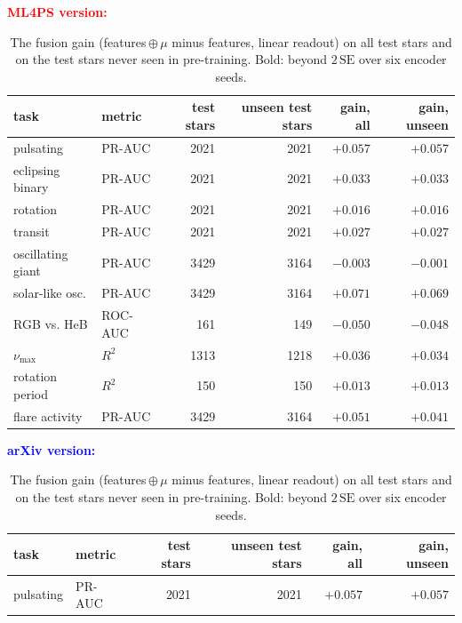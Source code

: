 \documentclass{article}
\providecommand{\DIFaddbeginFL}{} %
\providecommand{\DIFdelbeginFL}{} %
\providecommand{\DIFdelendFL}{} %
\providecommand{\DIFscaledelfig}{0.5}
\newlength{\DIFdelgraphicswidth} %
\newlength{\DIFdelgraphicsheight} %
\providecommand{\DIFaddincludegraphics}[2][]{{\color{blue}\fbox{\DIFOincludegraphics[#1]{#2}}}} %
\providecommand{\DIFdelincludegraphics}[2][]{%
\sbox{\DIFdelgraphicsbox}{\DIFOincludegraphics[#1]{#2}}%
\settoboxwidth{\DIFdelgraphicswidth}{\DIFdelgraphicsbox} %
\settoboxtotalheight{\DIFdelgraphicsheight}{\DIFdelgraphicsbox} %
\scalebox{\DIFscaledelfig}{%
\parbox[b]{\DIFdelgraphicswidth}{\usebox{\DIFdelgraphicsbox}\\[-\baselineskip] \rule{\DIFdelgraphicswidth}{0em}}\llap{\resizebox{\DIFdelgraphicswidth}{\DIFdelgraphicsheight}{%
\setlength{\unitlength}{\DIFdelgraphicswidth}%
\begin{picture}(1,1)%
\thicklines\linethickness{2pt} %
{\color[rgb]{1,0,0}\put(0,0){\framebox(1,1){}}}%
{\color[rgb]{1,0,0}\put(0,0){\line( 1,1){1}}}%
{\color[rgb]{1,0,0}\put(0,1){\line(1,-1){1}}}%
\end{picture}%
}\hspace*{3pt}}} %
} %
\DeclareRobustCommand{\DIFaddbeginFL}{\DIFOaddbeginFL \let\includegraphics\DIFaddincludegraphics} %
\DeclareRobustCommand{\DIFdelbeginFL}{\DIFOdelbeginFL \let\includegraphics\DIFdelincludegraphics} %
\DeclareRobustCommand{\DIFdelendFL}{\DIFOaddendFL \let\includegraphics\DIFOincludegraphics} %
\begin{document}
\begin{table}[H]
\caption{The fusion gain (features\,$\oplus\,\mu$ minus features, linear readout) on all test stars and
on the test stars never seen in pre-training. Bold: beyond $2\,\mathrm{SE}$ over six encoder seeds.}
\label{tab:unseen}
\centering
\scriptsize
\DIFdelbeginFL
{\scriptsize\textcolor{red}{\textbf{ML4PS version:}}}\par\nobreak\smallskip
\begingroup\color{red}
\begin{tabular}{llrrrr}
\toprule
task & metric & test stars & unseen test stars & gain, all & gain, unseen \\
\midrule
pulsating & PR-AUC & 2021 & 2021 & $\boldsymbol{+}\mathbf{0.057}$ & $\boldsymbol{+}\mathbf{0.057}$ \\
eclipsing binary & PR-AUC & 2021 & 2021 & $\boldsymbol{+}\mathbf{0.033}$ & $\boldsymbol{+}\mathbf{0.033}$ \\
rotation & PR-AUC & 2021 & 2021 & ${+}0.016$ & ${+}0.016$ \\
transit & PR-AUC & 2021 & 2021 & $\boldsymbol{+}\mathbf{0.027}$ & $\boldsymbol{+}\mathbf{0.027}$ \\
oscillating giant & PR-AUC & 3429 & 3164 & $\boldsymbol{-}\mathbf{0.003}$ & ${-}0.001$ \\
solar-like osc. & PR-AUC & 3429 & 3164 & $\boldsymbol{+}\mathbf{0.071}$ & $\boldsymbol{+}\mathbf{0.069}$ \\
RGB vs. HeB & ROC-AUC & 161 & 149 & $\boldsymbol{-}\mathbf{0.050}$ & $\boldsymbol{-}\mathbf{0.048}$ \\
$\nu_{\max}$ & $R^2$ & 1313 & 1218 & $\boldsymbol{+}\mathbf{0.036}$ & $\boldsymbol{+}\mathbf{0.034}$ \\
rotation period & $R^2$ & 150 & 150 & $\boldsymbol{+}\mathbf{0.013}$ & $\boldsymbol{+}\mathbf{0.013}$ \\
flare activity & PR-AUC & 3429 & 3164 & $\boldsymbol{+}\mathbf{0.051}$ & $\boldsymbol{+}\mathbf{0.041}$ \\
\bottomrule
\end{tabular}
\endgroup\par\medskip
{\scriptsize\textcolor{blue}{\textbf{arXiv version:}}}\par\nobreak\smallskip
\DIFdelendFL \DIFaddbeginFL \begin{tabular}{llrrrr}
\toprule
task & metric & test stars & unseen test stars & gain, all & gain, unseen \\
\midrule
pulsating & PR-AUC & 2021 & 2021 & $\boldsymbol{+}\mathbf{0.057}$ & $\boldsymbol{+}\mathbf{0.057}$ \\

\end{tabular}
\end{table}
\end{document}
